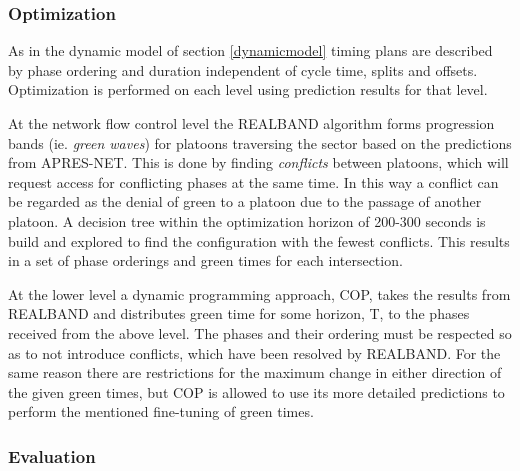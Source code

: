 \subsubsection*{Optimization}
As in the dynamic model of section \ref{dynamicmodel} timing plans are described by phase ordering and duration independent of cycle time, splits and offsets. 
Optimization is performed on each level using prediction results for that level.

At the network flow control level the REALBAND algorithm forms progression bands (ie. \textit{green waves}) for platoons traversing the sector based on the predictions from APRES-NET. This is done by finding \textit{conflicts} between platoons, which will request access for conflicting phases at the same time. In this way a conflict can be regarded as the denial of green to a platoon due to the passage of another platoon. A decision tree within the optimization horizon of 200-300 seconds is build and explored to find the configuration with the fewest conflicts. This results in a set of phase orderings and green times for each intersection.

At the lower level a dynamic programming approach, COP, takes the results from REALBAND and distributes green time for some horizon, T, to the phases received from the above level. The phases and their ordering must be respected so as to not introduce conflicts, which have been resolved by REALBAND. For the same reason there are restrictions for the maximum change in either direction of the given green times, but COP is allowed to use its more detailed predictions to perform the mentioned fine-tuning of green times.

\subsubsection*{Evaluation}
